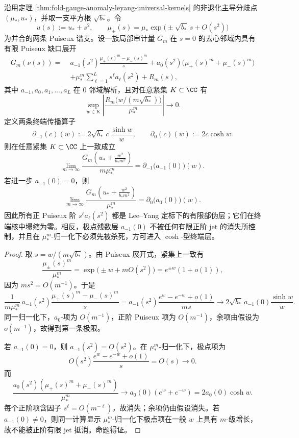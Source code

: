 \begin{proposition}\label{distill:grothendieck-cohomological_gap_filtration-folding-leyang-puiseux-terminal-residue}
沿用定理 \ref{thm:fold-gauge-anomaly-leyang-universal-kernels} 的非退化主导分歧点 \((\mu_\ast,u_\ast)\)，并取一支平方根 \(\sqrt{b_\ast}\)。令
\[
u(s):=u_\ast+s^2,
\qquad
\mu_\pm(s)=\mu_\ast\exp\bigl(\pm\sqrt{b_\ast}\,s+O(s^2)\bigr)
\]
为并合的两条 Puiseux 谱支。设一族局部审计量 \(G_m\) 在 \(s=0\) 的去心邻域内具有有限 Puiseux 缺口展开
\[
\begin{aligned}
G_m(\nu(s))=\;&a_{-1}(s^2)\frac{\mu_+(s)^m-\mu_-(s)^m}{s}
+a_0(s^2)\bigl(\mu_+(s)^m+\mu_-(s)^m\bigr)\\
&+\mu_\ast^m\sum_{\ell=1}^{L}s^\ell a_\ell(s^2)+R_m(s),
\end{aligned}
\]
其中 \(a_{-1},a_0,a_1,\ldots,a_L\) 在 \(0\) 邻域解析，且对任意紧集 \(K\subset\CC\) 有
\[
\sup_{w\in K}\left|\frac{R_m\bigl(w/(m\sqrt{b_\ast})\bigr)}{\mu_\ast^m}\right|\longrightarrow0.
\]
定义两条终端传播算子
\[
\partial_{-1}(c)(w):=2\sqrt{b_\ast}\,c\,\frac{\sinh w}{w},
\qquad
\partial_0(c)(w):=2c\cosh w .
\]
则在任意紧集 \(K\subset\CC\) 上一致成立
\[
\lim_{m\to\infty}
\frac{G_m\!\left(u_\ast+\frac{w^2}{b_\ast m^2}\right)}{m\mu_\ast^m}
=\partial_{-1}\bigl(a_{-1}(0)\bigr)(w).
\]
若进一步 \(a_{-1}(0)=0\)，则
\[
\lim_{m\to\infty}
\frac{G_m\!\left(u_\ast+\frac{w^2}{b_\ast m^2}\right)}{\mu_\ast^m}
=\partial_0\bigl(a_0(0)\bigr)(w).
\]
因此所有正 Puiseux 阶 \(s^\ell a_\ell(s^2)\) 都是 Lee--Yang 定标下的有限部伪层；它们在终端核中塌缩为零。相反，极点残数层 \(a_{-1}(0)\) 不被任何有限正阶 jet 的消失所控制，并且在 \(\mu_\ast^m\)-归一化下必须先被杀死，方可进入 \(\cosh\)-型终端层。
\end{proposition}
\begin{proof}
取 \(s=w/(m\sqrt{b_\ast})\)。由 Puiseux 展开式，紧集上一致有
\[
\frac{\mu_\pm(s)^m}{\mu_\ast^m}
=\exp\bigl(\pm w+mO(s^2)\bigr)=e^{\pm w}(1+o(1)),
\]
因为 \(m s^2=O(m^{-1})\)。于是
\[
\frac{1}{m\mu_\ast^m}\,
 a_{-1}(s^2)\frac{\mu_+(s)^m-\mu_-(s)^m}{s}
=a_{-1}(s^2)\frac{e^w-e^{-w}+o(1)}{ms}
\longrightarrow 2\sqrt{b_\ast}\,a_{-1}(0)\frac{\sinh w}{w}.
\]
同一归一化下，\(a_0\)-项为 \(O(m^{-1})\)，正阶 Puiseux 项为 \(O(m^{-1})\)，余项由假设为 \(o(m^{-1})\)，故得到第一条极限。

若 \(a_{-1}(0)=0\)，则 \(a_{-1}(s^2)=O(s^2)\)。在 \(\mu_\ast^m\)-归一化下，极点项为
\[
O(s^2)\frac{e^w-e^{-w}+o(1)}{s}=O(s)\longrightarrow0.
\]
而
\[
\frac{a_0(s^2)(\mu_+(s)^m+\mu_-(s)^m)}{\mu_\ast^m}
\longrightarrow a_0(0)(e^w+e^{-w})=2a_0(0)\cosh w.
\]
每个正阶项含因子 \(s^\ell=O(m^{-\ell})\)，故消失；余项仍由假设消失。若 \(a_{-1}(0)\ne0\)，则同一计算显示 \(\mu_\ast^m\)-归一化下极点项在一般 \(w\) 上具有 \(m\)-级增长，故不能被正阶有限 jet 抵消。命题得证。
\end{proof}
